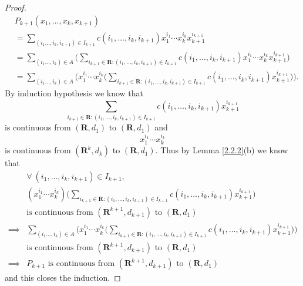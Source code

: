 \begin{proof}
    \begin{align*}
         & P_{k + 1}(x_1, \dots, x_k, x_{k + 1})                                                                                                                                                                                \\
         & = \sum_{(i_1 \dots, i_k, i_{k + 1}) \in I_{k + 1}} c(i_1, \dots, i_k, i_{k + 1}) x_1^{i_1} \cdots x_k^{i_k} x_{k + 1}^{i_{k + 1}}                                                                                    \\
         & = \sum_{(i_1 \dots, i_k) \in A} \bigg(\sum_{i_{k + 1} \in \mathbf{R} : (i_1, \dots, i_k, i_{k + 1}) \in I_{k + 1}} c(i_1, \dots, i_k, i_{k + 1}) x_1^{i_1} \cdots x_k^{i_k} x_{k + 1}^{i_{k + 1}}\bigg)              \\
         & = \sum_{(i_1 \dots, i_k) \in A} \Bigg(x_1^{i_1} \cdots x_k^{i_k} \bigg(\sum_{i_{k + 1} \in \mathbf{R} : (i_1, \dots, i_k, i_{k + 1}) \in I_{k + 1}} c(i_1, \dots, i_k, i_{k + 1}) x_{k + 1}^{i_{k + 1}}\bigg)\Bigg).
    \end{align*}
    By induction hypothesis we know that
    \[
        \sum_{i_{k + 1} \in \mathbf{R} : (i_1, \dots, i_k, i_{k + 1}) \in I_{k + 1}} c(i_1, \dots, i_k, i_{k + 1}) x_{k + 1}^{i_{k + 1}}
    \]
    is continuous from \((\mathbf{R}, d_1)\) to \((\mathbf{R}, d_1)\) and
    \[
        x_1^{i_1} \cdots x_k^{i_k}
    \]
    is continuous from \((\mathbf{R}^k, d_k)\) to \((\mathbf{R}, d_1)\).
    Thus by Lemma \ref{2.2.2}(b) we know that
    \begin{align*}
                 & \forall\ (i_1, \dots, i_k, i_{k + 1}) \in I_{k + 1},                                                                                                                                                              \\
                 & (x_1^{i_1} \cdots x_k^{i_k}) \bigg(\sum_{i_{k + 1} \in \mathbf{R} : (i_1, \dots, i_k, i_{k + 1}) \in I_{k + 1}} c(i_1, \dots, i_k, i_{k + 1}) x_{k + 1}^{i_{k + 1}}\bigg)                                         \\
                 & \text{is continuous from } (\mathbf{R}^{k + 1}, d_{k + 1}) \text{ to } (\mathbf{R}, d_1)                                                                                                                          \\
        \implies & \sum_{(i_1 \dots, i_k) \in A} \Bigg(x_1^{i_1} \cdots x_k^{i_k} \bigg(\sum_{i_{k + 1} \in \mathbf{R} : (i_1, \dots, i_k, i_{k + 1}) \in I_{k + 1}} c(i_1, \dots, i_k, i_{k + 1}) x_{k + 1}^{i_{k + 1}}\bigg)\Bigg) \\
                 & \text{is continuous from } (\mathbf{R}^{k + 1}, d_{k + 1}) \text{ to } (\mathbf{R}, d_1)                                                                                                                          \\
        \implies & P_{k + 1} \text{ is continuous from } (\mathbf{R}^{k + 1}, d_{k + 1}) \text{ to } (\mathbf{R}, d_1)
    \end{align*}
    and this closes the induction.
\end{proof}

